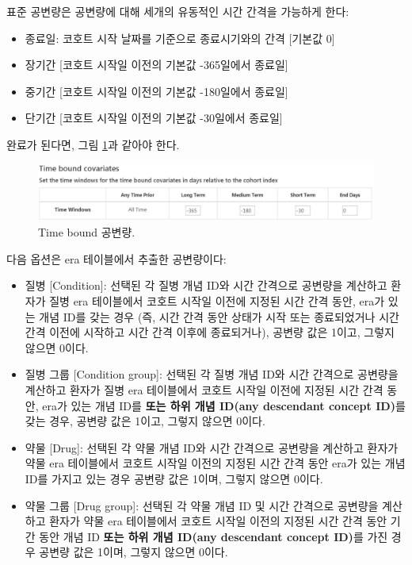\documentclass[11pt]{book}
\providecommand{\tightlist}{%
  \setlength{\itemsep}{0pt}\setlength{\parskip}{0pt}}
\theoremstyle{definition}
\theoremstyle{definition}
\theoremstyle{definition}
\theoremstyle{remark}
\begin{document}
표준 공변량은 공변량에 대해 세개의 유동적인 시간 간격을 가능하게 한다:

\begin{itemize}
\tightlist
\item
  종료일: 코호트 시작 날짜를 기준으로 종료시기와의 간격 {[}기본값 0{]}
\item
  장기간 {[}코호트 시작일 이전의 기본값 -365일에서 종료일{]}
\item
  중기간 {[}코호트 시작일 이전의 기본값 -180일에서 종료일{]}
\item
  단기간 {[}코호트 시작일 이전의 기본값 -30일에서 종료일{]}
\end{itemize}

완료가 된다면, 그림 \ref{fig:covariateSettings3}과 같아야 한다.

\begin{figure}

{\centering \includegraphics[width=1\linewidth]{images/PatientLevelPrediction/covariateSettings3} 

}

\caption{Time bound 공변량.}\label{fig:covariateSettings3}
\end{figure}

다음 옵션은 era 테이블에서 추출한 공변량이다:

\begin{itemize}
\tightlist
\item
  질병 {[}Condition{]}: 선택된 각 질병 개념 ID와 시간 간격으로 공변량을
  계산하고 환자가 질병 era 테이블에서 코호트 시작일 이전에 지정된 시간
  간격 동안, era가 있는 개념 ID를 갖는 경우 (즉, 시간 간격 동안 상태가
  시작 또는 종료되었거나 시간 간격 이전에 시작하고 시간 간격 이후에
  종료되거나), 공변량 값은 1이고, 그렇지 않으면 0이다.
\item
  질병 그룹 {[}Condition group{]}: 선택된 각 질병 개념 ID와 시간
  간격으로 공변량을 계산하고 환자가 질병 era 테이블에서 코호트 시작일
  이전에 지정된 시간 간격 동안, era가 있는 개념 ID를 \textbf{또는 하위
  개념 ID(any descendant concept ID)}를 갖는 경우, 공변량 값은 1이고,
  그렇지 않으면 0이다.
\item
  약물 {[}Drug{]}: 선택된 각 약물 개념 ID와 시간 간격으로 공변량을
  계산하고 환자가 약물 era 테이블에서 코호트 시작일 이전의 지정된 시간
  간격 동안 era가 있는 개념 ID를 가지고 있는 경우 공변량 값은 1이며,
  그렇지 않으면 0이다.
\item
  약물 그룹 {[}Drug group{]}: 선택된 각 약물 개념 ID 및 시간 간격으로
  공변량을 계산하고 환자가 약물 era 테이블에서 코호트 시작일 이전의
  지정된 시간 간격 동안 기간 동안 개념 ID \textbf{또는 하위 개념 ID(any
  descendant concept ID)}를 가진 경우 공변량 값은 1이며, 그렇지 않으면
  0이다.
\end{itemize}
\end{document}
